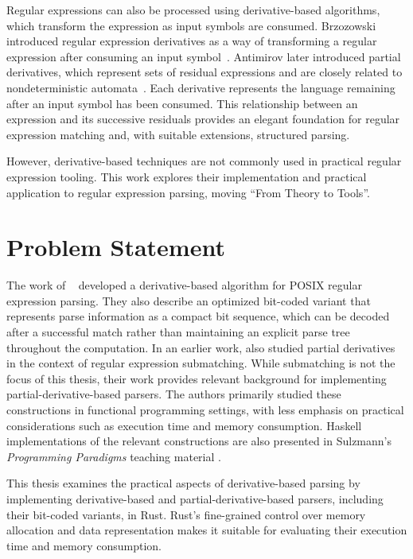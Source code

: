 Regular expressions can also be processed using derivative-based algorithms, 
which transform the expression as input symbols are consumed. 
Brzozowski introduced regular expression derivatives 
as a way of transforming a regular expression 
after consuming an input symbol~\citep{brzozowski1964}. 
Antimirov later introduced partial derivatives, 
which represent sets of residual expressions and are closely related 
to nondeterministic automata~\citep{antimirov1996}.
Each derivative represents the language remaining after an input symbol has been consumed.
This relationship between an expression and its successive residuals
provides an elegant foundation for regular expression matching and, 
with suitable extensions, structured parsing.

However, derivative-based techniques are not commonly used 
in practical regular expression tooling. 
This work explores their implementation 
and practical application to regular expression parsing, 
moving ``From Theory to Tools''.

%
%
%

\clearpage
\section{Problem Statement}
\label{sec:problem-statement}

The work of ~\citep{sulzmannlu2014} developed a derivative-based algorithm 
for POSIX regular expression parsing. 
They also describe an optimized bit-coded variant 
that represents parse information as a compact bit sequence,
which can be decoded after a successful match 
rather than maintaining an explicit parse tree throughout the computation. 
In an earlier work, \citep{sulzmannlu2012} 
also studied partial derivatives in the context 
of regular expression submatching. 
While submatching is not the focus of this thesis, 
their work provides relevant background 
for implementing partial-derivative-based parsers. 
The authors primarily studied these constructions 
in functional programming settings, 
with less emphasis on practical considerations 
such as execution time and memory consumption.
Haskell implementations of the relevant constructions are also presented
in Sulzmann's \emph{Programming Paradigms} teaching material
\citep{sulzmann_slides}.

This thesis examines the practical aspects of derivative-based parsing
by implementing derivative-based and partial-derivative-based parsers,
including their bit-coded variants, in Rust. 
Rust's fine-grained control over memory allocation and data representation 
makes it suitable for evaluating their execution time and memory consumption.

